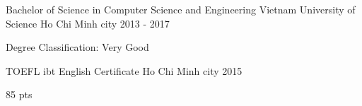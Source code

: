 

\begin{cventries}

  \cventry
    {Bachelor of Science in Computer Science and Engineering} %
    {Vietnam University of Science} %
    {Ho Chi Minh city} %
    {2013 - 2017} %
    {
      \begin{cvitems} %
        \item {Degree Classification: Very Good}
      \end{cvitems}
    }

\cventry
    {TOEFL ibt} %
    {English Certificate} %
    {Ho Chi Minh city} %
    {2015} %
    {
      \begin{cvitems} %
        \item {85 pts}
      \end{cvitems}
    }

\end{cventries}
